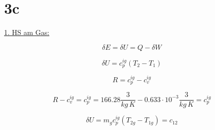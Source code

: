 

\section*{3c}

\underline{1. HS am Gas:}

\[
\delta E = \delta U = Q - \delta W
\]

\[
\delta U = c_p^{ig} (T_2 - T_1)
\]

\[
R = c_p^{ig} - c_v^{ig}
\]

\[
R - c_v^{ig} = c_p^{ig} = 166.28 \frac{3}{kg \, K} - 0.633 \cdot 10^{-3} \frac{3}{kg \, K} = c_p^{ig}
\]

\[
\delta U = m_g c_p^{ig} (T_{2g} - T_{1g}) = c_{12}
\]
